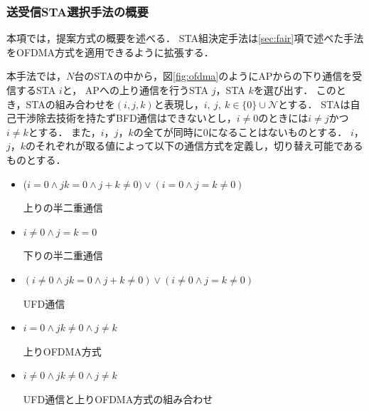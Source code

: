 \documentclass[master]{kuisthesis}		%
\newcommand{\mN}{{\mathcal N}}
\newcommand{\sijk}{(i,j,k)}
\begin{document}
			\subsubsection{送受信STA選択手法の概要}\label{sec:pair_def}
				本項では，提案方式の概要を述べる．
				STA組決定手法は\ref{sec:fair}項で述べた手法をOFDMA方式を適用できるように拡張する．
				\par
				本手法では，$N$台のSTAの中から，図\ref{fig:ofdma}のようにAPからの下り通信を受信するSTA $i$と，
				APへの上り通信を行うSTA $j$，STA $k$を選び出す．
				このとき，STAの組み合わせを$\sijk$と表現し，$i,\ j,\ k \in \{0\}\cup \mN$とする．
				STAは自己干渉除去技術を持たずBFD通信はできないとし，$i\neq0$のときには$i\neq j$かつ$i\neq k$とする．
				また，$i$，$j$，$k$の全てが同時に0になることはないものとする．
				$i$，$j$，$k$のそれぞれが取る値によって以下の通信方式を定義し，切り替え可能であるものとする．
				\begin{itemize}%
					\item ($i=0\land jk=0\land j+k\neq0)\lor (i=0\land j=k\neq0)$\par
					\hspace*{15pt}上りの半二重通信
					\item $i\neq0\land j=k=0$\par
					\hspace*{15pt}下りの半二重通信
					\item $(i\neq0\land jk=0 \land j+k\neq0)\lor(i\neq0\land j=k\neq0)$\par
					\hspace*{15pt}UFD通信
					\item $i=0\land jk\neq0 \land j\neq k$\par
					\hspace*{15pt}上りOFDMA方式
					\item $i\neq0 \land jk\neq0 \land j\neq k$\par
					\hspace*{15pt}UFD通信と上りOFDMA方式の組み合わせ
				\end{itemize}
				\par
\end{document}
